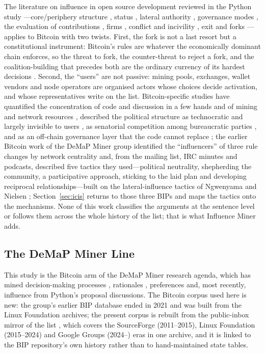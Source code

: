 \documentclass[sigconf,screen]{acmart}
\begin{document}
The literature on influence in open source development reviewed in the Python study \cite{influenceMinerPython}---core/periphery structure \cite{mockus2002, crowston2005}, status \cite{stewart2005}, lateral authority \cite{dahlander2011}, governance modes \cite{omahony2007, markus2007, shaikh2017}, the evaluation of contributions \cite{tsay2014, alami2020}, firms \cite{schaarschmidt2015, zhang2022}, conflict and incivility \cite{filippova2016, ferreira2021, miller2022}, exit and forks \cite{hirschman1970, robles2012}---applies to Bitcoin with two twists. First, the fork is not a last resort but a constitutional instrument: Bitcoin's rules are whatever the economically dominant chain enforces, so the threat to fork, the counter-threat to reject a fork, and the coalition-building that precedes both are the ordinary currency of its hardest decisions \cite{bier2021, bohme2015}. Second, the ``users'' are not passive: mining pools, exchanges, wallet vendors and node operators are organised actors whose choices decide activation, and whose representatives write on the list. Bitcoin-specific studies have quantified the concentration of code and discussion in a few hands \cite{azouvi2018} and of mining and network resources \cite{gencer2018, gervais2014}, described the political structure as technocratic and largely invisible to users \cite{defilippi2016}, as senatorial competition among bureaucratic parties \cite{parkin2019}, and as an off-chain governance layer that the code cannot replace \cite{reijers2021}; the earlier Bitcoin work of the DeMaP Miner group identified the ``influencers'' of three rule changes by network centrality and, from the mailing list, IRC minutes and podcasts, described five tactics they used---political neutrality, shepherding the community, a participative approach, sticking to the laid plan and developing reciprocal relationships---built on the lateral-influence tactics of Ngwenyama and Nielsen \cite{thapa2021bitcoin, ngwenyama2014}; Section~\ref{sec:icis} returns to those three BIPs and maps the tactics onto the mechanisms. None of this work classifies the arguments at the sentence level or follows them across the whole history of the list; that is what Influence Miner adds.

\subsection{The DeMaP Miner Line}

This study is the Bitcoin arm of the DeMaP Miner research agenda, which has mined decision-making processes \cite{sharma2022demap}, rationales \cite{sharma2024rationale}, preferences and, most recently, influence \cite{influenceMinerPython} from Python's proposal discussions. The Bitcoin corpus used here is new: the group's earlier BIP database ended in 2021 and was built from the Linux Foundation archives; the present corpus is rebuilt from the public-inbox mirror of the list \cite{gnusha}, which covers the SourceForge (2011--2015), Linux Foundation (2015--2024) and Google Groups (2024--) eras in one archive, and it is linked to the BIP repository's own history rather than to hand-maintained state tables.
\end{document}
